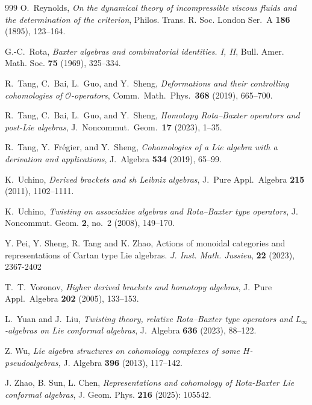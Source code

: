 \documentclass[a4paper,11pt]{article}
\numberwithin{equation}{section}
\begin{document}
\begin{thebibliography}{999}
O.~Reynolds,
\textit{On the dynamical theory of incompressible viscous fluids and the
determination of the criterion},
Philos. Trans. R. Soc. London Ser.~A \textbf{186} (1895), 123--164.

G.-C.~Rota,
\textit{Baxter algebras and combinatorial identities. I, II},
Bull. Amer. Math. Soc. \textbf{75} (1969), 325--334.

R.~Tang, C.~Bai, L.~Guo, and Y.~Sheng,
\emph{Deformations and their controlling cohomologies of
$\mathcal{O}$-operators},
Comm.\ Math.\ Phys.\ \textbf{368} (2019), 665--700.

R.~Tang, C.~Bai, L.~Guo, and Y.~Sheng,
\emph{Homotopy Rota--Baxter operators and post-Lie algebras},
J.\ Noncommut.\ Geom.\ \textbf{17} (2023), 1--35.

R.~Tang, Y.~Fr\'egier, and Y.~Sheng,
\emph{Cohomologies of a Lie algebra with a derivation and applications},
J.\ Algebra \textbf{534} (2019), 65--99.

K.~Uchino,
\emph{Derived brackets and sh Leibniz algebras},
J.\ Pure Appl.\ Algebra \textbf{215} (2011), 1102--1111.

K.~Uchino,
\textit{Twisting on associative algebras and Rota--Baxter type operators},
J. Noncommut. Geom. \textbf{2}, no.~2 (2008), 149--170.

  Y. Pei, Y. Sheng, R. Tang and K. Zhao, Actions of monoidal categories and representations of Cartan type Lie
algebras. \textit{J. Inst. Math. Jussieu}, \textbf{22} (2023), 2367-2402

T.~T.~Voronov,
\emph{Higher derived brackets and homotopy algebras},
J.\ Pure Appl.\ Algebra \textbf{202} (2005), 133--153.

L.~Yuan and J.~Liu,
\emph{Twisting theory, relative Rota--Baxter type operators and
$L_\infty$-algebras on Lie conformal algebras},
J.\ Algebra \textbf{636} (2023), 88--122.

  Z. Wu, \textit{Lie algebra structures on cohomology complexes of some $H$-pseudoalgebras,} J. Algebra \textbf{396} (2013),
117--142.

 J. Zhao, B. Sun, L. Chen, 
\textit{Representations and cohomology of Rota-Baxter Lie conformal algebras}, 
J. Geom. Phys. \textbf{216} (2025): 105542.

\end{thebibliography}
\end{document}
